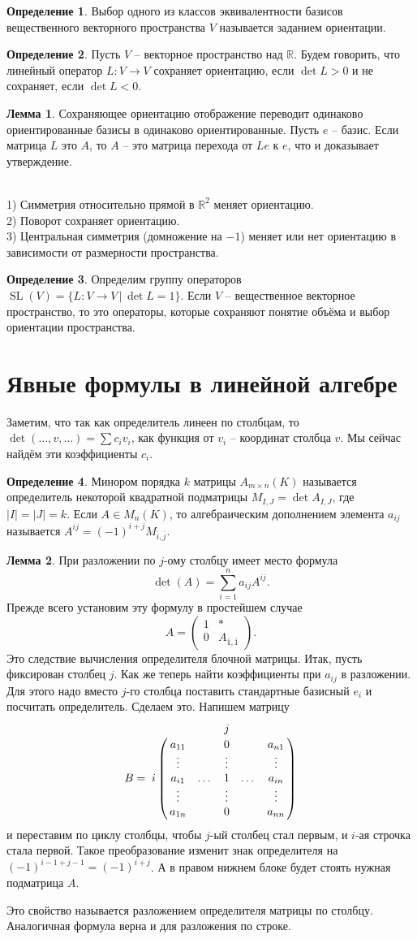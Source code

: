 \documentclass[10pt,a4paper,oneside]{book} %
\theoremstyle{definition}
\newtheorem*{defn}{Определение}
\newtheorem{lem}{Лемма}
\newcommand{\mb}[1]{\mathbb{#1}}
\newcommand{\ovl}{\overline}
\newcommand{\SL}{\operatorname{SL}}
\def\exm{\noindent {\bf Примеры:}}
\def\dfn{\begin{defn}}
\def\edfn{\end{defn}}
\def\lm{\begin{lem}}
\def\elm{\end{lem}}
\def\pmat{\begin{pmatrix}}
\def\epmat{\end{pmatrix}}
\begin{document}
\dfn Выбор одного из классов эквивалентности базисов вещественного векторного пространства $V$ называется заданием ориентации.
\edfn

\dfn Пусть $V$ -- векторное пространство над $\mb R$. Будем говорить, что линейный оператор $L\colon V \to V$ сохраняет ориентацию, если $\det L>0$ и не сохраняет, если $\det L<0$.
\edfn

\lm Сохраняющее ориентацию отображение переводит одинаково ориентированные базисы в одинаково ориентированные.
\proof Пусть $e$ -- базис. Если матрица $L$ это $A$, то $A$ -- это матрица перехода от $Le$ к $e$, что и доказывает утверждение.
\endproof
\elm

\exm\\
1) Симметрия относительно прямой в $\mb R^2$ меняет ориентацию.\\
2) Поворот сохраняет ориентацию.\\
3) Центральная симметрия (домножение на $-1$) меняет или нет ориентацию в зависимости от размерности пространства.


\dfn Определим группу операторов $\SL(V)=\{ L\colon V \to V \,|\, \det L=1\}$. Если $V$ -- вещественное векторное пространство, то это операторы, которые сохраняют понятие объёма и  выбор ориентации пространства.
\edfn



\section{Явные формулы в линейной алгебре}

Заметим, что так как определитель линеен по столбцам, то $\det (\dots,v,\dots)= \sum c_i v_i$, как функция от $v_i$ -- координат  столбца $v$. Мы сейчас найдём эти коэффициенты $c_i$.

\dfn Минором порядка $k$ матрицы $A_{m\times n}(K)$ называется определитель некоторой квадратной подматрицы $M_{I,J}=\det A_{I,J}$, где $|I|=|J|=k$. Если $A\in M_n(K)$, то алгебраическим дополнением элемента $a_{ij}$ называется $A^{ij}=(-1)^{i+j} M_{\ovl{i},\ovl{j}}$.
\edfn



\lm При разложении по $j$-ому столбцу имеет место формула  $$\det(A)=\sum_{i=1}^n a_{ij} A^{ij}.$$
\proof Прежде всего установим эту формулу в простейшем случае $$A=\pmat 1& *\\
0& A_{\ovl{1},\ovl{1}}\epmat. $$
Это следствие вычисления определителя блочной матрицы. Итак, пусть фиксирован столбец $j$. Как же теперь найти коэффициенты при $a_{ij}$ в разложении. Для этого надо вместо $j$-го столбца поставить стандартные базисный $e_i$ и посчитать определитель. Сделаем это. Напишем матрицу
$$B= \bordermatrix{
 & &       &  j &      & \cr
 & a_{11} && 0 &  & a_{n1}    \cr
 & \vdots& & \vdots& & \vdots\cr
 i &a_{i1}&\dots & 1 &\dots & a_{in} \cr
 & \vdots& & \vdots& & \vdots\cr
 & a_{1n} &  & 0 &      &a_{nn} } $$
и переставим по циклу столбцы, чтобы $j$-ый столбец стал первым, и $i$-ая строчка стала первой. Такое преобразование изменит знак определителя на $(-1)^{i-1+j-1}=(-1)^{i+j}$. А в правом нижнем блоке будет стоять нужная подматрица $A$.
\endproof
\elm
Это свойство называется разложением  определителя матрицы  по столбцу. Аналогичная формула верна и для разложения по строке.
\end{document}
